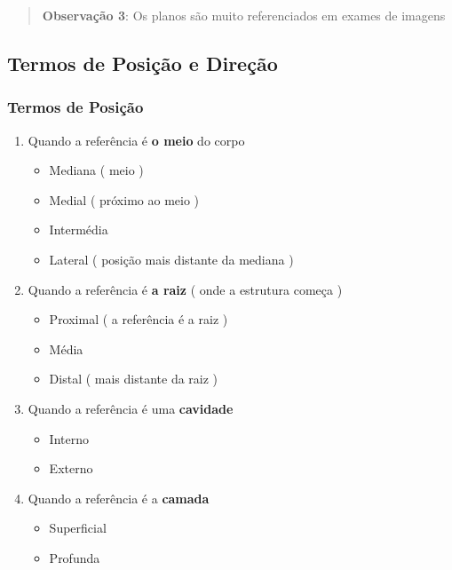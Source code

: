 \documentclass[
]{book}
\providecommand{\tightlist}{%
  \setlength{\itemsep}{0pt}\setlength{\parskip}{0pt}}
\begin{document}
\begin{quote}
\textbf{Observação 3}: Os planos são muito referenciados em exames de imagens
\end{quote}

\hypertarget{termos-de-posiuxe7uxe3o-e-direuxe7uxe3o}{%
\subsection{Termos de Posição e Direção}\label{termos-de-posiuxe7uxe3o-e-direuxe7uxe3o}}

\hypertarget{termos-de-posiuxe7uxe3o}{%
\subsubsection{Termos de Posição}\label{termos-de-posiuxe7uxe3o}}

\begin{enumerate}
\def\labelenumi{\arabic{enumi}.}
\tightlist
\item
  Quando a referência é \textbf{o meio} do corpo

  \begin{itemize}
  \tightlist
  \item
    Mediana ( meio )
  \item
    Medial ( próximo ao meio )
  \item
    Intermédia
  \item
    Lateral ( posição mais distante da mediana )
  \end{itemize}
\item
  Quando a referência é \textbf{a raiz} ( onde a estrutura começa )

  \begin{itemize}
  \tightlist
  \item
    Proximal ( a referência é a raiz )
  \item
    Média
  \item
    Distal ( mais distante da raiz )
  \end{itemize}
\item
  Quando a referência é uma \textbf{cavidade}

  \begin{itemize}
  \tightlist
  \item
    Interno
  \item
    Externo
  \end{itemize}
\item
  Quando a referência é a \textbf{camada}

  \begin{itemize}
  \tightlist
  \item
    Superficial
  \item
    Profunda
  \end{itemize}
\end{enumerate}
\end{document}
